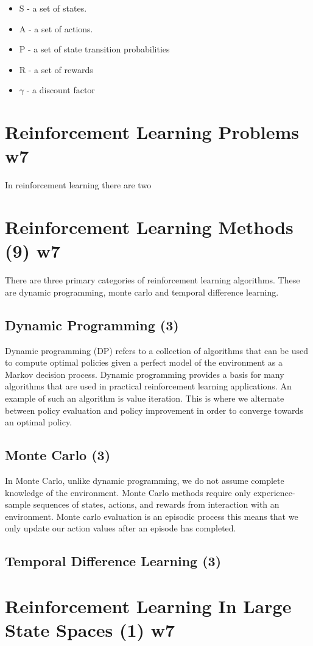 \begin{itemize}
    \item S - a set of states.
    \item A - a set of actions.
    \item P - a set of state transition probabilities
    \item R - a set of rewards
    \item $\gamma$ - a discount factor
\end{itemize}

\section{Reinforcement Learning Problems w7}\label{sec:rlProblems}
In reinforcement learning there are two

\section{Reinforcement Learning Methods (9) w7}\label{sec:rlMethods}
There are three primary categories of reinforcement learning algorithms.
These are dynamic programming, monte carlo and temporal difference learning.

\subsection{Dynamic Programming (3)}\label{subsec:dp}
Dynamic programming (DP) refers to a collection of algorithms that can be used to compute optimal policies given a
perfect model of the environment as a Markov decision process\cite{sutton1998reinforcement}.
Dynamic programming provides a basis for many algorithms that are used in practical reinforcement learning applications.
An example of such an algorithm is value iteration.
This is where we alternate between policy evaluation and policy improvement in order to converge towards an optimal
policy.

\subsection{Monte Carlo (3)}\label{subsec:mc}
In Monte Carlo, unlike dynamic programming, we do not assume complete knowledge of the environment.
Monte Carlo methods require only experience-sample sequences of states, actions, and rewards from interaction with
an environment\cite{sutton1998reinforcement}.
Monte carlo evaluation is an episodic process this means that we only update our action values after an episode
has completed.


\subsection{Temporal Difference Learning (3)}\label{subsec:td}


\section{Reinforcement Learning In Large State Spaces (1) w7}\label{sec:rlLargeStateSpace}